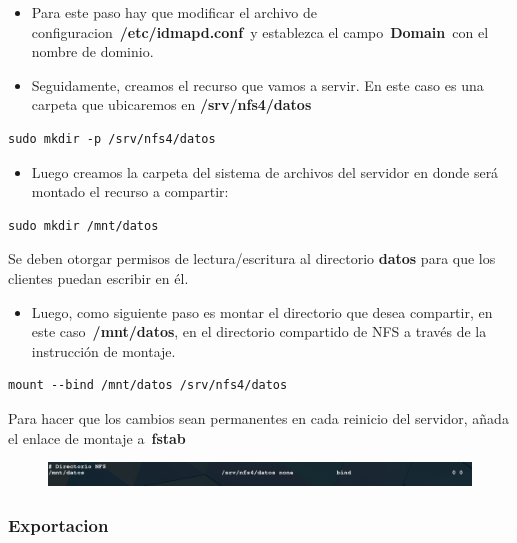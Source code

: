 \documentclass[12pt]{extarticle}
\providecommand{\tightlist}{%
      \setlength{\itemsep}{0pt}\setlength{\parskip}{0pt}}
\begin{document}
\begin{itemize}
\item
  Para este paso hay que modificar el archivo de
  configuracion~\textbf{/etc/idmapd.conf}~y establezca el
  campo~\textbf{Domain}~con el nombre de dominio.
\item
  Seguidamente, creamos el recurso que vamos a servir. En este caso es
  una carpeta que ubicaremos en \textbf{/srv/nfs4/datos}
\end{itemize}

\begin{verbatim}
sudo mkdir -p /srv/nfs4/datos
\end{verbatim}

\begin{itemize}
\tightlist
\item
  Luego creamos la carpeta del sistema de archivos del servidor en donde
  será montado el recurso a compartir:
\end{itemize}

\begin{verbatim}
sudo mkdir /mnt/datos
\end{verbatim}

Se deben otorgar permisos de lectura/escritura al directorio
\textbf{datos} para que los clientes puedan escribir en él.

\begin{itemize}
\tightlist
\item
  Luego, como siguiente paso es montar el directorio que desea
  compartir, en este caso~\textbf{/mnt/datos}, en el directorio
  compartido de NFS a través de la instrucción de montaje.
\end{itemize}

\begin{verbatim}
mount --bind /mnt/datos /srv/nfs4/datos
\end{verbatim}

Para hacer que los cambios sean permanentes en cada reinicio del
servidor, añada el enlace de montaje a~\textbf{fstab}

\begin{figure}
\centering
\includegraphics{images/fstab.png}
\caption{}
\end{figure}

\subsubsection{Exportacion}\label{exportacion}
\end{document}
